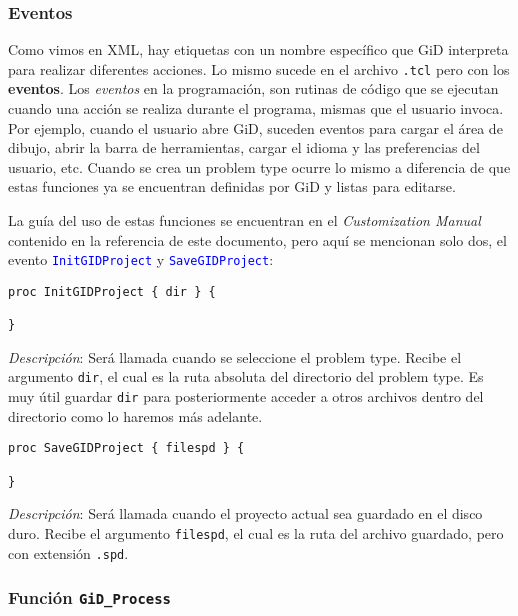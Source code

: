 \documentclass[10pt, a4paper, twocolumn]{article}
\begin{document}
\subsubsection{Eventos} \label{sec:eventosGiD}

Como vimos en XML, hay etiquetas con un nombre específico que GiD interpreta para realizar diferentes acciones. Lo mismo sucede en el archivo \texttt{.tcl} pero con los \textbf{eventos}. Los \textit{eventos} en la programación, son rutinas de código que se ejecutan cuando una acción se realiza durante el programa, mismas que el usuario invoca. Por ejemplo, cuando el usuario abre GiD, suceden eventos para cargar el área de dibujo, abrir la barra de herramientas, cargar el idioma y las preferencias del usuario, etc. Cuando se crea un problem type ocurre lo mismo a diferencia de que estas funciones ya se encuentran definidas por GiD y listas para editarse.

La guía del uso de estas funciones se encuentran en el \textit{Customization Manual} contenido en la referencia de este documento, pero aquí se mencionan solo dos, el evento \textcolor{blue}{\texttt{InitGIDProject}} y \textcolor{blue}{\texttt{SaveGIDProject}}:

\lstset{language=tcl} 
\begin{lstlisting}[caption={Evento que se ejecuta al iniciar el problemtype.}]
proc InitGIDProject { dir } {

}
\end{lstlisting}

\textit{Descripción}: Será llamada cuando se seleccione el problem type. Recibe el argumento \texttt{dir}, el cual es la ruta absoluta del directorio del problem type. Es muy útil guardar \texttt{dir} para posteriormente  acceder a otros archivos dentro del directorio como lo haremos más adelante.

\begin{lstlisting}[caption={Evento que se ejecuta al guardar un proyecto en GiD durante la ejecución de un problem type.}]
proc SaveGIDProject { filespd } {

}
\end{lstlisting}

\textit{Descripción}: Será llamada cuando el proyecto actual sea guardado en el disco duro. Recibe el argumento \texttt{filespd}, el cual es la ruta del archivo guardado, pero con extensión \texttt{.spd}.

\subsubsection{Función \texttt{GiD\_Process}} \label{sec:GiDProcess}
\end{document}
